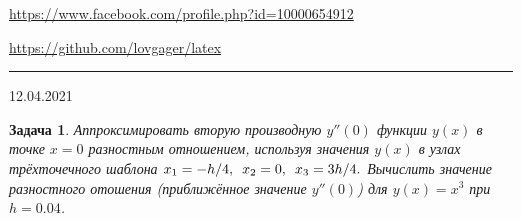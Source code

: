 \documentclass[12pt]{article}
\begin{document}


\begin{flushleft}
\url{https://www.facebook.com/profile.php?id=10000654912}

\url{https://github.com/lovgager/latex}
\end{flushleft}
\hrule 
\begin{flushright}
12.04.2021
\end{flushright}
\bigskip


\newtheorem*{task}{Задача}
\begin{task}
Аппроксимировать вторую производную $y''(0)$ функции $y(x)$ в точке $x=0$ разностным отношением, используя значения $y(x)$ в узлах трёхточечного шаблона $x_1=-h/4, \enskip x_2=0, \enskip x_3=3h/4.$ Вычислить значение разностного отошения (приближённое значение $y''(0)$) для $y(x)=x^3$ при $h=0.04$.
\end{task}
\end{document}
